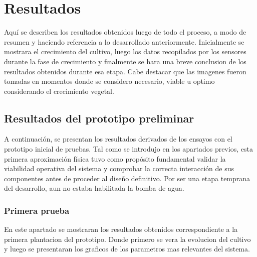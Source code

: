 \cleardoublepage
{} %
\chapter*{Resultados}
\setcounter{figure}{0} %

Aquí se describen los resultados obtenidos luego de todo el proceso, a modo de resumen y haciendo referencia a lo desarrollado anteriormente. Inicialmente se mostrara el crecimiento del cultivo, luego los datos recopilados por los sensores durante la fase de crecimiento y finalmente se hara una breve conclusion de los resultados obtenidos durante esa etapa. Cabe destacar que las imagenes fueron tomadas en momentos donde se considero necesario, viable u optimo considerando el crecimiento vegetal.

\section*{Resultados del prototipo preliminar}
A continuación, se presentan los resultados derivados de los ensayos con el prototipo inicial de pruebas. Tal como se introdujo en los apartados previos, esta primera aproximación física tuvo como propósito fundamental validar la viabilidad operativa del sistema y comprobar la correcta interacción de sus componentes antes de proceder al diseño definitivo. Por ser una etapa temprana del desarrollo, aun no estaba habilitada la bomba de agua.

\subsection*{Primera prueba}
En este apartado se mostraran los resultados obtenidos correspondiente a la primera plantacion del prototipo. Donde primero se vera la evolucion del cultivo y luego se presentaran los graficos de los parametros mas relevantes del sistema.

